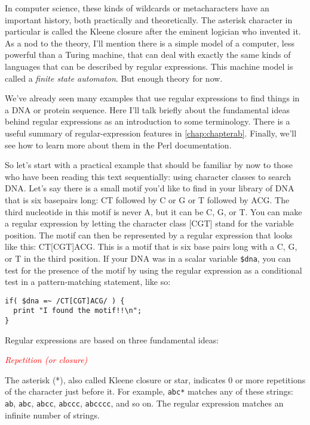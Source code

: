 In computer science, these kinds of wildcards or metacharacters have an important history, both practically and theoretically. The asterisk character in particular is called the Kleene closure after the eminent logician who invented it. As a nod to the theory, I'll mention there is a simple model of a computer, less powerful than a Turing machine, that can deal with exactly the same kinds of languages that can be described by regular expressions. This machine model is called a \textit{finite state automaton}. But enough theory for now. 

We've already seen many examples that use regular expressions to find things in a DNA or protein sequence. Here I'll talk briefly about the fundamental ideas behind regular expressions as an introduction to some terminology. There is a useful summary of regular-expression features in \autoref{chap:chapterab}. Finally, we'll see how to learn more about them in the Perl documentation.

So let's start with a practical example that should be familiar by now to those who have been reading this text sequentially: using character classes to search DNA. Let's say there is a small motif you'd like to find in your library of DNA that is six basepairs long: CT followed by C or G or T followed by ACG. The third nucleotide in this motif is never A, but it can be C, G, or T. You can make a regular expression by letting the character class [CGT] stand for the variable position. The motif can then be represented by a regular expression that looks like this: CT[CGT]ACG. This is a motif that is six base pairs long with a C, G, or T in the third position. If your DNA was in a scalar variable \verb|$dna|, you can test for the presence of the motif by using the regular expression as a conditional test in a pattern-matching statement, like so:

\begin{lstlisting}
if( $dna =~ /CT[CGT]ACG/ ) {
  print "I found the motif!!\n";
}
\end{lstlisting}

Regular expressions are based on three fundamental ideas:

\textcolor{red}{\textit{Repetition (or closure)}}
\begin{adjustwidth}{2em}{}
The asterisk (*), also called Kleene closure or star, indicates 0 or more repetitions of the character just before it. For example, \verb|abc*| matches any of these strings: \verb|ab|, \verb|abc|, \verb|abcc|, \verb|abccc|, \verb|abcccc|, and so on. The regular expression matches an infinite number of strings. 
\end{adjustwidth}

